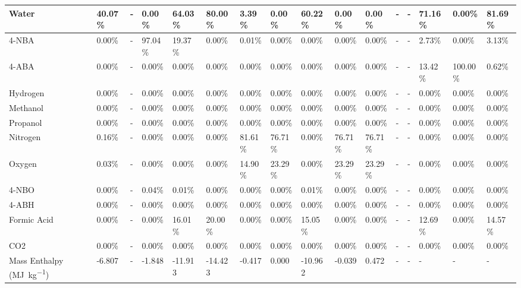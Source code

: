 \begin{landscape}
\begin{table}[H]
\begin{tabular}{|l|l|l|l|l|l|l|l|l|l|l|l|l|l|l|l|}
Water                   & 40.07\% & -    & 0.00\%  & 64.03\% & 80.00\% & 3.39\%  & 0.00\%  & 60.22\% & 0.00\%  & 0.00\%  & -    & -    & 71.16\% & 0.00\%   & 81.69\% \\ \hline
4-NBA                   & 0.00\%  & -    & 97.04\% & 19.37\% & 0.00\%  & 0.01\%  & 0.00\%  & 0.00\%  & 0.00\%  & 0.00\%  & -    & -    & 2.73\%  & 0.00\%   & 3.13\%  \\ \hline
4-ABA                   & 0.00\%  & -    & 0.00\%  & 0.00\%  & 0.00\%  & 0.00\%  & 0.00\%  & 0.00\%  & 0.00\%  & 0.00\%  & -    & -    & 13.42\% & 100.00\% & 0.62\%  \\ \hline
Hydrogen                & 0.00\%  & -    & 0.00\%  & 0.00\%  & 0.00\%  & 0.00\%  & 0.00\%  & 0.00\%  & 0.00\%  & 0.00\%  & -    & -    & 0.00\%  & 0.00\%   & 0.00\%  \\ \hline
Methanol                & 0.00\%  & -    & 0.00\%  & 0.00\%  & 0.00\%  & 0.00\%  & 0.00\%  & 0.00\%  & 0.00\%  & 0.00\%  & -    & -    & 0.00\%  & 0.00\%   & 0.00\%  \\ \hline
Propanol                & 0.00\%  & -    & 0.00\%  & 0.00\%  & 0.00\%  & 0.00\%  & 0.00\%  & 0.00\%  & 0.00\%  & 0.00\%  & -    & -    & 0.00\%  & 0.00\%   & 0.00\%  \\ \hline
Nitrogen                & 0.16\%  & -    & 0.00\%  & 0.00\%  & 0.00\%  & 81.61\% & 76.71\% & 0.00\%  & 76.71\% & 76.71\% & -    & -    & 0.00\%  & 0.00\%   & 0.00\%  \\ \hline
Oxygen                  & 0.03\%  & -    & 0.00\%  & 0.00\%  & 0.00\%  & 14.90\% & 23.29\% & 0.00\%  & 23.29\% & 23.29\% & -    & -    & 0.00\%  & 0.00\%   & 0.00\%  \\ \hline
4-NBO                   & 0.00\%  & -    & 0.04\%  & 0.01\%  & 0.00\%  & 0.00\%  & 0.00\%  & 0.01\%  & 0.00\%  & 0.00\%  & -    & -    & 0.00\%  & 0.00\%   & 0.00\%  \\ \hline
4-ABH                   & 0.00\%  & -    & 0.00\%  & 0.00\%  & 0.00\%  & 0.00\%  & 0.00\%  & 0.00\%  & 0.00\%  & 0.00\%  & -    & -    & 0.00\%  & 0.00\%   & 0.00\%  \\ \hline
Formic Acid             & 0.00\%  & -    & 0.00\%  & 16.01\% & 20.00\% & 0.00\%  & 0.00\%  & 15.05\% & 0.00\%  & 0.00\%  & -    & -    & 12.69\% & 0.00\%   & 14.57\% \\ \hline
CO2                     & 0.00\%  & -    & 0.00\%  & 0.00\%  & 0.00\%  & 0.00\%  & 0.00\%  & 0.00\%  & 0.00\%  & 0.00\%  & -    & -    & 0.00\%  & 0.00\%   & 0.00\%  \\ \hline
Mass Enthalpy (\si{\mega\J\per\kg})    & -6.807  & -    & -1.848  & -11.913 & -14.423 & -0.417  & 0.000   & -10.962 & -0.039  & 0.472   & -    & -    & -       & -        & -       \\ \hline
\end{tabular}
\end{table}



\end{landscape}
